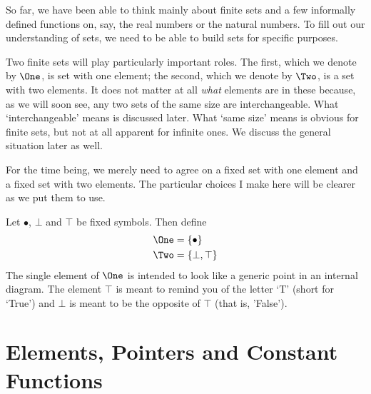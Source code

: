 So far, we have been able to think mainly about finite sets and a few informally defined functions on, say, the real numbers or the natural numbers.
To fill out our understanding of sets, we need to be able to build sets for specific purposes.

Two finite sets will play particularly important roles.
The first, which we denote by $\One$, is  set with one element; the second, which we denote by $\Two$, is a set with two elements.
It does not matter at all \emph{what} elements are in these because, as we will soon see, any two sets of the same size are interchangeable.
What `interchangeable' means is discussed later.
What `same size' means is obvious for finite sets, but not at all apparent for infinite ones.
We discuss the general situation later as well.

For the time being, we merely need to agree on a fixed set with one element and a fixed set with two elements.
The particular choices I make here will be clearer as we put them to use.

\begin{defn}
	Let $\bullet$, $\bot$ and $\top$ be fixed symbols. Then define
	\begin{align*}
		\One &= \{\bullet\}\\
		\Two &= \{\bot,\top\}
	\end{align*} 
	The single element of $\One$ is intended to look like a generic point in an internal diagram.
	The element $\top$ is meant to remind you of the letter `T' (short for `True') and $\bot$ is meant to be the opposite of $\top$ (that is, 'False').
\end{defn}


\section{Elements, Pointers and Constant Functions}

